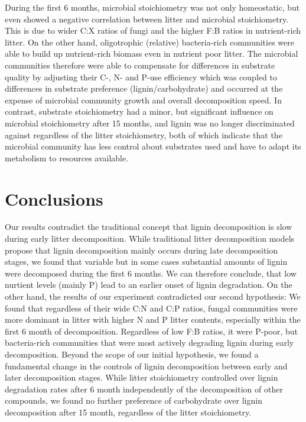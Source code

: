 During the first 6 months, microbial stoichiometry was not only homeostatic, but even showed a negative correlation between litter and microbial stoichiometry. This is due to wider C:X ratios of fungi and the higher F:B ratios in nutrient-rich litter. On the other hand, oligotrophic (relative) bacteria-rich communities were able to build up nutrient-rich biomass even in nutrient poor litter. The microbial communities therefore were able to compensate for differences in substrate quality by adjusting their C-, N- and P-use efficiency \cite{Mooshammer2011} which was coupled to differences in substrate preference (lignin/carbohydrate) and occurred at the expense of microbial community growth and overall decomposition speed. In contrast, substrate stoichiometry had a minor, but significant influence on microbial stoichiometry after 15 months, and lignin was no longer discriminated against regardless of the litter stoichiometry, both of which indicate that the microbial community has less control about substrates used and have to adapt its metabolism to resources available. 

\section*{Conclusions}

Our results contradict the traditional concept that lignin decomposition is slow during early litter decomposition. While traditional litter decomposition models propose that lignin decomposition mainly occurs during late decomposition stages, we found that variable but in some cases substantial amounts of lignin were decomposed during the first 6 months. We can therefore conclude, that low nurtient levels (mainly P) lead to an earlier onset of lignin degradation. On the other hand, the results of our experiment contradicted our second hypothesis: We found that regardless of their wide C:N and C:P ratios, fungal communities were more dominant in litter with higher N and P litter contents, especially within the first 6 month of decomposition. Regardless of low F:B ratios, it were P-poor, but bacteria-rich communities that were most actively degrading lignin during early decomposition. Beyond the scope of our initial hypothesis, we found a fundamental change in the controls of lignin decomposition between early and later decomposition stages. While litter stoichiometry controlled over lignin degradation rates after 6 month independently of the decomposition of other compounds, we found no further preference of carbohydrate over lignin decomposition after 15 month, regardless of the litter stoichiometry.